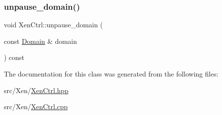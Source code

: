 \mbox{\label{classxd_1_1xen_1_1_xen_ctrl_a03d0163103225ba51055560b953a407b}} 
\subsubsection{\texorpdfstring{unpause\+\_\+domain()}{unpause\_domain()}}
{\footnotesize\ttfamily void Xen\+Ctrl\+::unpause\+\_\+domain (\begin{DoxyParamCaption}\item[{const \mbox{\hyperlink{classxd_1_1xen_1_1_domain}{Domain}} \&}]{domain }\end{DoxyParamCaption}) const}



The documentation for this class was generated from the following files\+:\begin{DoxyCompactItemize}
\item 
src/\+Xen/\mbox{\hyperlink{_xen_ctrl_8hpp}{Xen\+Ctrl.\+hpp}}\item 
src/\+Xen/\mbox{\hyperlink{_xen_ctrl_8cpp}{Xen\+Ctrl.\+cpp}}\end{DoxyCompactItemize}
